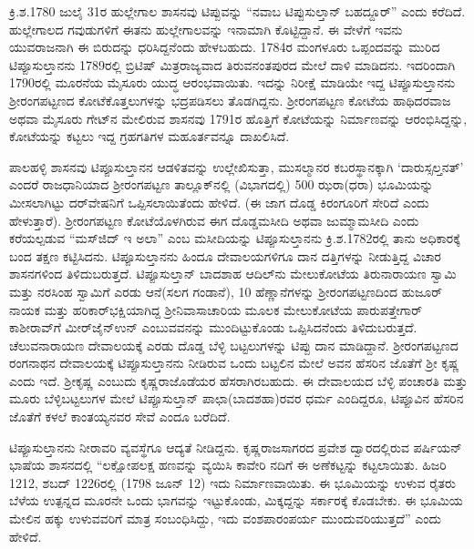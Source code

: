 ಕ್ರಿ.ಶ.1780 ಜುಲೈ 31ರ ಹುಲ್ಲೇಗಾಲ ಶಾಸನವು ಟಿಪ್ಪುವನ್ನು “ನವಾಬ ಟಿಪ್ಪುಸುಲ್ತಾನ್​ ಬಹದ್ದೂರ್​” ಎಂದು ಕರೆದಿದೆ. ಹುಲ್ಲೇಗಾಲದ ಗವುಡುಗಳಿಗೆ ಈತನು ಹುಲ್ಲೇಗಾಲವನ್ನು ಇನಾಮಾಗಿ ಕೊಟ್ಟಿದ್ದಾನೆ. ಈ ವೇಳೆಗೆ ಇವನು ಯುವರಾಜನಾಗಿ ಈ ಬಿರುದನ್ನು ಧರಿಸಿದ್ದನೆಂದು ಹೇಳಬಹುದು. 1784ರ ಮಂಗಳೂರು ಒಪ್ಪಂದವನ್ನು ಮುರಿದ ಟಿಪ್ಪೂಸುಲ್ತಾನನು 1789ರಲ್ಲಿ ಬ್ರಿಟಿಷ್​ ಮಿತ್ರರಾಜ್ಯವಾದ ತಿರುವನಂತಪುರದ ಮೇಲೆ ದಾಳಿ ಮಾಡಿದನು. ಇದರಿಂದಾಗಿ 1790ರಲ್ಲಿ ಮೂರನೆಯ ಮೈಸೂರು ಯುದ್ಧ ಆರಂಭವಾಯಿತು. ಇದನ್ನು ನಿರೀಕ್ಷೆ ಮಾಡಿಯೇ ಇದ್ದ ಟಿಪ್ಪೂಸುಲ್ತಾನನು ಶ‍್ರೀರಂಗಪಟ್ಟಣದ ಕೋಟೆಕೊತ್ತಲುಗಳನ್ನು ಭದ್ರಪಡಿಸಲು ತೊಡಗಿದ್ದನು. ಶ‍್ರೀರಂಗಪಟ್ಟಣ ಕೋಟೆಯ ಹಾಥಿದರವಾಜ ಅಥವಾ ಮೈಸೂರು ಗೇಟ್​ನ ಮೇಲಿರುವ ಶಾಸನವು 1791ರ ಹೊತ್ತಿಗೆ ಕೋಟೆಯನ್ನು ನಿರ್ಮಾಣವನ್ನು ಆರಂಭಿಸಿದ್ದನ್ನು, ಕೋಟೆಯನ್ನು ಕಟ್ಟಲು ಇದ್ದ ಗ್ರಹಗತಿಗಳ ಮಹೂರ್ತವನ್ನೂ ದಾಖಲಿಸಿದೆ.

ಪಾಲಹಳ್ಳಿ ಶಾಸನವು ಟಿಪ್ಪೂಸುಲ್ತಾನನ ಆಡಳಿತವನ್ನು ಉಲ್ಲೇಖಿಸುತ್ತಾ, ಮುಸಲ್ಮಾನರ ಕಬರಸ್ಥಾನಕ್ಕಾಗಿ ‘ದಾರುಸ್ಸಲ್ತನತ್​’ ಎಂದರೆ ರಾಜಧಾನಿಯಾದ ಶ‍್ರೀರಂಗಪಟ್ಟಣ ತಾಲ್ಲೂಕ್​ನಲ್ಲಿ (ವಿಭಾಗದಲ್ಲಿ) 500 ಝರಾ(ಧರಾ) ಭೂಮಿಯನ್ನು ಮೀಸಲಾಗಿಟ್ಟು ದರ್​ವೇಷನಿಗೆ ಒಪ್ಪಿಸಲಾಯಿತೆಂದು ಹೇಳಿದೆ. (ಈ ಜಾಗ ದೊಡ್ಡ ಕಿರಂಗೂರಿಗೆ ಸೇರಿದೆ ಎಂದು ಹೇಳುತ್ತಾರೆ). ಶ‍್ರೀರಂಗಪಟ್ಟಣ ಕೋಟೆಯೊಳಗಿರುವ ಈಗ ದೊಡ್ಡಮಸೀದಿ ಅಥವಾ ಜುಮ್ಮಾಮಸೀದಿ ಎಂದು ಕರೆಯಲ್ಪಡುವ “ಮಸ್​ಜಿದ್​ ಇ ಅಲಾ” ಎಂಬ ಮಸೀದಿಯನ್ನು ಟಿಪ್ಪೂಸುಲ್ತಾನನು ಕ್ರಿ.ಶ.1782ರಲ್ಲಿ ತಾನು ಅಧಿಕಾರಕ್ಕೆ ಬಂದ ತಕ್ಷಣ ಕಟ್ಟಿಸಿದನು. ಟಿಪ್ಪೂಸುಲ್ತಾನನು ಹಿಂದೂ ದೇವಾಲಯಗಳಿಗೂ ದಾನ ದತ್ತಿಗಳನ್ನು ನೀಡುತ್ತಿದ್ದ ವಿಚಾರ ಶಾಸನಗಳಿಂದ ತಿಳಿದುಬರುತ್ತದೆ. ಟಿಪ್ಪೂಸುಲ್ತಾನ್​ ಬಾದಶಾಹ ಆದಿಲ್​ನು ಮೇಲುಕೋಟೆಯ ತಿರುನಾರಾಯಣ ಸ್ವಾಮಿ ಮತ್ತು ನರಸಿಂಹ ಸ್ವಾಮಿಗೆ ಎರಡು ಆನೆ(ಸಲಗ ಗಂಡಾನೆ), 10 ಹೆಣ್ಣಾನೆಗಳನ್ನು ಶ‍್ರೀರಂಗಪಟ್ಟಣದಿಂದ ಹುಜೂರ್​ನಾಯಕ ಮತ್ತು ಹರಿಕಾರ್​ಭಕ್ಷಿಯಾಗಿದ್ದ ಶ‍್ರೀನಿವಾಸಾಚಾರಿಯ ಮೂಲಕ ಮೇಲುಕೋಟೆಯ ಪಾರುಪತ್ತೇಗಾರ್​ ಕಾಶೀರಾವ್​ಗೆ ಮೀರ್​ಜೈನ್​ಉನ್​ ಎಂಬುವವನನ್ನು ಮುಂದಿಟ್ಟುಕೊಂಡು ಒಪ್ಪಿಸಿದನೆಂದು ತಿಳಿದುಬರುತ್ತದೆ. ಚೆಲುವನಾರಾಯಣ ದೇವಾಲಯಕ್ಕೆ ಎರಡು ದೊಡ್ಡ ಬೆಳ್ಳಿ ಬಟ್ಟಲುಗಳನ್ನು ಟಿಪ್ಪು ದಾನ ಮಾಡಿದ್ದಾನೆ. ಶ‍್ರೀರಂಗಪಟ್ಟಣದ ರಂಗನಾಥನ ದೇವಾಲಯಕ್ಕೆ ಟಿಪ್ಪೂಸುಲ್ತಾನನು ನೀಡಿರುವ ಒಂದು ಬಟ್ಟಲಿನ ಮೇಲೆ ಅವನ ಹೆಸರಿನ ಜೊತೆಗೆ ಶ‍್ರೀ ಕೃಷ್ಣ ಎಂದು ಇದೆ. ಶ‍್ರೀಕೃಷ್ಣ ಎಂಬುದು ಕೃಷ್ಣರಾಜೊಡೆಯರ ಹೆಸರಾಗಿರಬಹುದು. ಈ ದೇವಾಲಯದ ಬೆಳ್ಳಿ ಪಂಚಾರತಿ ಮತ್ತು ಮೂರು ಬೆಳ್ಳಿಬಟ್ಟಲುಗಳ ಮೇಲೆ ಟಿಪ್ಪೂಸುಲ್ತಾನ್​ ಪಾಛಾ(ಬಾದಶಹಾ)ರವರ ಧರ್ಮ ಎಂದಿದ್ದರೂ, ಟಿಪ್ಪೂವಿನ ಹೆಸರಿನ ಜೊತೆಗೆ ಕಳಲೆ ಕಾಂತಯ್ಯನವರ ಸೇವೆ ಎಂದೂ ಬರೆದಿದೆ.

ಟಿಪ್ಪೂಸುಲ್ತಾನನು ನೀರಾವರಿ ವ್ಯವಸ್ಥೆಗೂ ಆದ್ಯತೆ ನೀಡಿದ್ದನು. ಕೃಷ್ಣರಾಜಸಾಗರದ ಪ್ರವೇಶ ದ್ವಾರದಲ್ಲಿರುವ ಪರ್ಷಿಯನ್​ ಭಾಷೆಯ ಶಾಸನದಲ್ಲಿ “ಲಕ್ಷೋಪಲಕ್ಷ ಹಣವನ್ನು ವ್ಯಯಿಸಿ ಕಾವೇರಿ ನದಿಗೆ ಈ ಅಣೆಕಟ್ಟನ್ನು ಕಟ್ಟಲಾಯಿತು. ಹಿಜರಿ 1212, ಶಬದ್​ 1226ರಲ್ಲಿ (1798 ಜೂನ್​ 12) ಇದು ನಿರ್ಮಾಣವಾಯಿತು. ಈ ಭೂಮಿಯನ್ನು ಉಳುವ ರೈತರು ಬೆಳೆಯ ಉತ್ಪನ್ನದ ಮೂರನೇ ಒಂದು ಭಾಗವನ್ನು ಇಟ್ಟುಕೊಂಡು, ಮಿಕ್ಕದ್ದನ್ನು ಸರ್ಕಾರಕ್ಕೆ ಕೊಡಬೇಕು. ಈ ಭೂಮಿಯ ಮೇಲಿನ ಹಕ್ಕು ಉಳುವವರಿಗೆ ಮಾತ್ರ ಸಂಬಂಧಿಸಿದ್ದು, ಇದು ವಂಶಪಾರಂಪರ್ಯ ಮುಂದುವರಿಯುತ್ತದೆ” ಎಂದು ಹೇಳಿದೆ.

